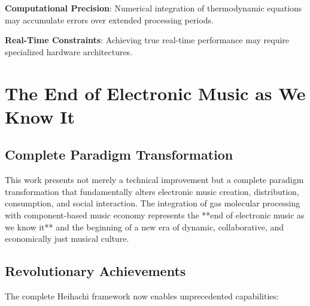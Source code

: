 \documentclass[12pt,a4paper]{article}
\begin{document}
\textbf{Computational Precision}: Numerical integration of thermodynamic equations may accumulate errors over extended processing periods.

\textbf{Real-Time Constraints}: Achieving true real-time performance may require specialized hardware architectures.

\section{The End of Electronic Music as We Know It}

\subsection{Complete Paradigm Transformation}

This work presents not merely a technical improvement but a complete paradigm transformation that fundamentally alters electronic music creation, distribution, consumption, and social interaction. The integration of gas molecular processing with component-based music economy represents the **end of electronic music as we know it** and the beginning of a new era of dynamic, collaborative, and economically just musical culture.

\subsection{Revolutionary Achievements}

The complete Heihachi framework now enables unprecedented capabilities:
\end{document}
